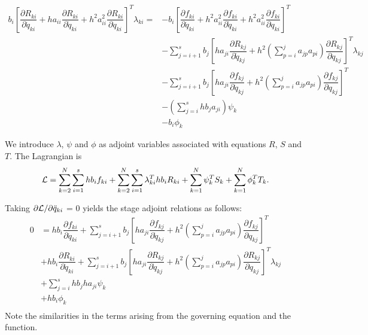\documentclass[10pt,letter]{book}
\newcommand{\pd}[2]{\dfrac{\partial #1}{\partial #2}}
\begin{document}
     \begin{equation}\nonumber
       \begin{split}
         b_i \left[ \pd{R_{ki}}{\ddot{q}_{ki}} + ha_{ii} \pd{R_{ki}}{\dot{q}_{ki}} + h^2 a_{ii}^2 \pd{R_{ki}}{{q}_{ki}} \right]^T \lambda_{ki} = & - b_i \left[ \pd{f_{ki}}{\ddot{q}_{ki}} + h^2a_{ii}^2 \pd{f_{ki}}{\dot{q}_{ki}} + h^2a_{ii}^2 \pd{f_{ki}}{{q}_{ki}} \right]^T \\
         & - \sum_{j=i+1}^s b_j \left[ ha_{ji} \pd{R_{kj}}{\dot{q}_{kj}} 
           + h^2 (\sum_{p=i}^j a_{jp}a_{pi}) 
           \pd{R_{kj}}{{q}_{kj}} \right]^T \lambda_{kj} \\
         & -  \sum_{j=i+1}^s b_j \left[ ha_{ji} \pd{f_{kj}}{\dot{q}_{kj}} 
           + h^2 (\sum_{p=i}^j a_{jp}a_{pi}) 
           \pd{f_{kj}}{{q}_{kj}} \right]^T  \\
         & -   (\sum_{j=i}^s h b_j a_{ji}) \psi_{k}  \\
         &  - b_i \phi_{k} 
       \end{split}
     \end{equation}

     We introduce $\lambda$, $\psi$ and $\phi$ as adjoint variables associated with equations $R$, $S$ and $T$. The Lagrangian is
     $$ {\cal{L}} = \sum_{k=2}^{N} \sum_{i=1}^s h b_i f_{ki}  +  \sum_{k=2}^{N} \sum_{i=1}^s\lambda_{ki}^T  h b_i R_{ki}   + \sum_{k=1}^N \psi_k^T S_k + \sum_{k=1}^N \phi_k^T T_k. $$

     Taking $\partial{\cal{L}}/\partial{\ddot{q}_{ki}}$ = 0 yields the stage adjoint relations as follows:
     \begin{equation}\nonumber
       \begin{split}
         0 & = hb_i \pd{f_{ki}}{\ddot{q}_{ki}} + \sum_{j=i+1}^s b_j \left[ ha_{ji} \pd{f_{kj}}{\dot{q}_{kj}} 
           + h^2 (\sum_{p=i}^j a_{jp}a_{pi}) 
           \pd{f_{kj}}{{q}_{kj}} \right]^T \\
         &  + hb_i \pd{R_{ki}}{\ddot{q}_{ki}} + \sum_{j=i+1}^s b_j \left[ ha_{ji} \pd{R_{kj}}{\dot{q}_{kj}} 
           + h^2 (\sum_{p=i}^j a_{jp}a_{pi}) 
           \pd{R_{kj}}{{q}_{kj}} \right]^T \lambda_{kj} \\ 
         &  + \sum_{j=i}^s h b_j h a_{ji} \psi_{k}  \\
         &  +  h b_i \phi_{k} \\
       \end{split}
     \end{equation}
     Note the similarities in the terms arising from the governing
     equation and the function.
\end{document}
